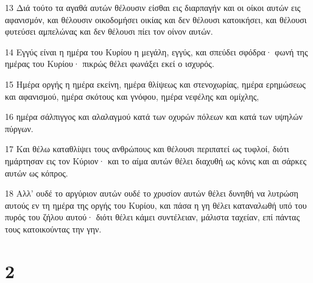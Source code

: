 \par 13 Διά τούτο τα αγαθά αυτών θέλουσιν είσθαι εις διαρπαγήν και οι οίκοι αυτών εις αφανισμόν, και θέλουσιν οικοδομήσει οικίας και δεν θέλουσι κατοικήσει, και θέλουσι φυτεύσει αμπελώνας και δεν θέλουσι πίει τον οίνον αυτών.
\par 14 Εγγύς είναι η ημέρα του Κυρίου η μεγάλη, εγγύς, και σπεύδει σφόδρα· φωνή της ημέρας του Κυρίου· πικρώς θέλει φωνάξει εκεί ο ισχυρός.
\par 15 Ημέρα οργής η ημέρα εκείνη, ημέρα θλίψεως και στενοχωρίας, ημέρα ερημώσεως και αφανισμού, ημέρα σκότους και γνόφου, ημέρα νεφέλης και ομίχλης,
\par 16 ημέρα σάλπιγγος και αλαλαγμού κατά των οχυρών πόλεων και κατά των υψηλών πύργων.
\par 17 Και θέλω καταθλίψει τους ανθρώπους και θέλουσι περιπατεί ως τυφλοί, διότι ημάρτησαν εις τον Κύριον· και το αίμα αυτών θέλει διαχυθή ως κόνις και αι σάρκες αυτών ως κόπρος.
\par 18 Αλλ' ουδέ το αργύριον αυτών ουδέ το χρυσίον αυτών θέλει δυνηθή να λυτρώση αυτούς εν τη ημέρα της οργής του Κυρίου, και πάσα η γη θέλει καταναλωθή υπό του πυρός του ζήλου αυτού· διότι θέλει κάμει συντέλειαν, μάλιστα ταχείαν, επί πάντας τους κατοικούντας την γην.

\chapter{2}

